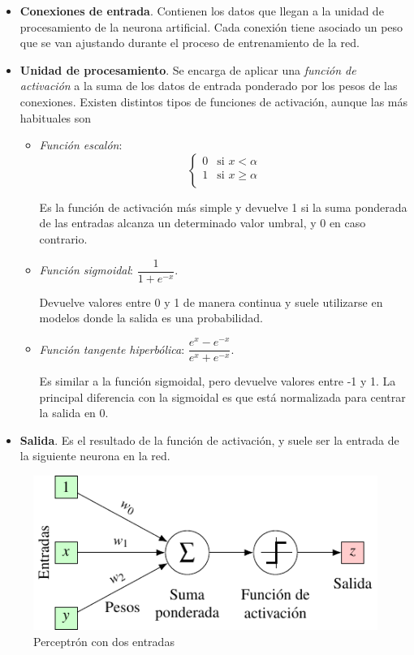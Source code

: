 \documentclass[
  a4paper,
]{scrreport}
\begin{document}
\begin{itemize}
\item
  \textbf{Conexiones de entrada}. Contienen los datos que llegan a la
  unidad de procesamiento de la neurona artificial. Cada conexión tiene
  asociado un peso que se van ajustando durante el proceso de
  entrenamiento de la red.
\item
  \textbf{Unidad de procesamiento}. Se encarga de aplicar una
  \emph{función de activación} a la suma de los datos de entrada
  ponderado por los pesos de las conexiones. Existen distintos tipos de
  funciones de activación, aunque las más habituales son

  \begin{itemize}
  \item
    \emph{Función escalón}: \[
      \begin{cases}
      0 & \text{si } x < \alpha \\
      1 & \text{si } x \geq \alpha\\
      \end{cases} 
      \]

    Es la función de activación más simple y devuelve 1 si la suma
    ponderada de las entradas alcanza un determinado valor umbral, y 0
    en caso contrario.
  \item
    \emph{Función sigmoidal}: \(\dfrac{1}{1+e^{-x}}\).

    Devuelve valores entre 0 y 1 de manera continua y suele utilizarse
    en modelos donde la salida es una probabilidad.
  \item
    \emph{Función tangente hiperbólica}:
    \(\dfrac{e^x-e^{-x}}{e^x+e^{-x}}\).

    Es similar a la función sigmoidal, pero devuelve valores entre -1 y
    1. La principal diferencia con la sigmoidal es que está normalizada
    para centrar la salida en 0.
  \end{itemize}
\item
  \textbf{Salida}. Es el resultado de la función de activación, y suele
  ser la entrada de la siguiente neurona en la red.
\end{itemize}

\begin{figure}

{\centering \includegraphics{img/perceptron/perceptron.pdf}

}

\caption{Perceptrón con dos entradas}

\end{figure}
\end{document}
